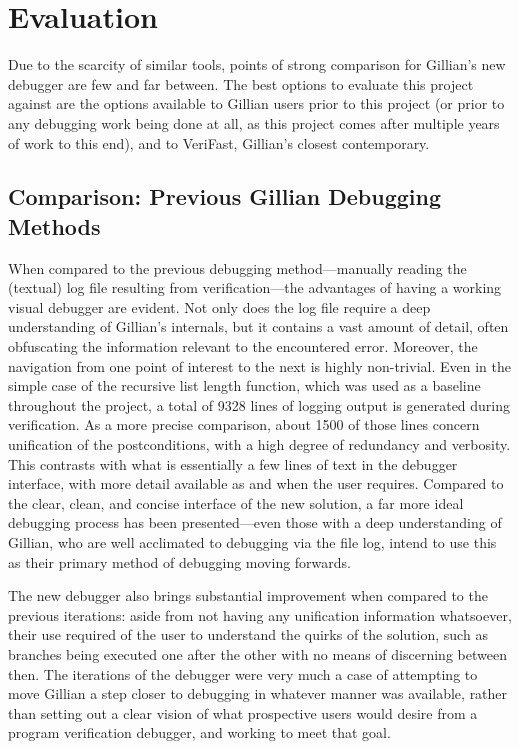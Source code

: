 
\chapter{Evaluation}\label{sec:eval}

Due to the scarcity of similar tools, points of strong comparison for Gillian's
new debugger are few and far between. The best options to evaluate this project
against are the options available to Gillian users prior to this project (or
prior to any debugging work being done at all, as this project comes after
multiple years of work to this end), and to VeriFast, Gillian's closest
contemporary.

\section{Comparison: Previous Gillian Debugging Methods}

When compared to the previous debugging method---manually reading the (textual) log file
resulting from verification---the advantages of having a working visual debugger are evident. Not only does the log file require a deep understanding of Gillian's
internals, but it contains a vast amount of detail, often obfuscating the
information relevant to the encountered error. Moreover, the navigation from one point of interest to the next is highly non-trivial. 
Even in the simple case of the recursive list length function, which was used as
a baseline throughout the project, a total of 9328 lines of logging output is
generated during verification. As a more precise comparison, about 1500 of those
lines concern unification of the postconditions, with a high degree of
redundancy and verbosity. This contrasts with what is essentially a few lines of
text in the debugger interface, with more detail available as and when the user
requires. Compared to the clear, clean, and concise interface of the new
solution, a far more ideal debugging process has been presented---even those
with a deep understanding of Gillian, who are well acclimated to debugging via
the file log, intend to use this as their primary method of debugging moving
forwards.


The new debugger also brings substantial improvement when compared to the previous iterations: aside from not having any unification information whatsoever, their use required of the user to understand the quirks of the solution, such as branches being executed one after the other with no means of discerning between then. 
The iterations of the debugger were very much a case of attempting to move Gillian a step closer to debugging in whatever manner was available, rather than setting out a clear vision of what prospective users would desire from a program verification debugger, and working to meet that goal.

